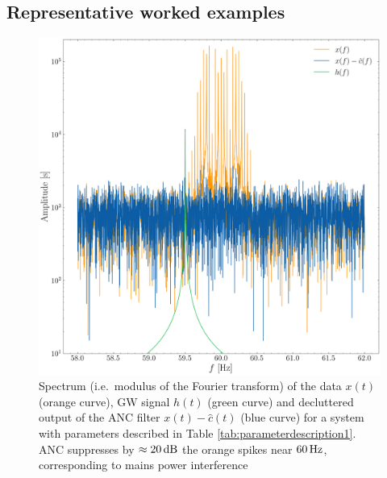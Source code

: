 \documentclass[pra,superscriptaddress,reprint,amsmath,amssymb,nofootinbib]{revtex4-2}
\begin{document}
\subsection{Representative worked examples} \label{sec:representative_example}
\begin{figure}
	\begin{center}
		\includegraphics[width=\columnwidth]{images/spectrum.png}
	\end{center}
	\caption{Spectrum (i.e.\ modulus of the Fourier transform) of the data $x(t)$ (orange curve), GW signal $h(t)$ (green curve) and decluttered output of the ANC filter $x(t) - \hat{c}(t)$ (blue curve) for a system with parameters described in Table \ref{tab:parameterdescription1}. ANC suppresses by $\approx 20\, {\rm dB}$ the orange spikes near $60 \, {\rm Hz}$, corresponding to mains power interference}
	\label{fig:spectrum}
\end{figure}
\end{document}
